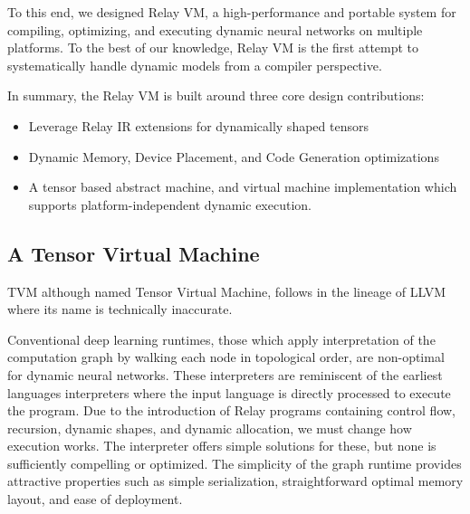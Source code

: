 To this end, we designed Relay VM, a high-performance and portable system for compiling, optimizing,
  and executing dynamic neural networks on multiple platforms.
To the best of our knowledge, Relay VM is the first attempt to
  systematically handle dynamic models from a compiler perspective.

In summary, the Relay VM is built around three core design contributions:
\begin{itemize}
  \item Leverage Relay IR extensions for dynamically shaped tensors
  \item Dynamic Memory, Device Placement, and Code Generation optimizations
  \item A tensor based abstract machine, and virtual machine implementation which
        supports platform-independent dynamic execution.
\end{itemize}

\subsection{A Tensor Virtual Machine}

TVM although named Tensor Virtual Machine, follows in the lineage of LLVM
  where its name is technically inaccurate.

Conventional deep learning runtimes, those which apply interpretation of the
  computation graph by walking each node in topological order, are non-optimal
  for dynamic neural networks.
These interpreters are reminiscent of the earliest
  languages interpreters where the input language is directly
  processed to execute the program.
Due to the introduction of Relay programs containing
  control flow, recursion, dynamic shapes, and dynamic allocation,
  we must change how execution works.
The interpreter offers simple solutions for these,
  but none is sufficiently compelling or optimized.
The simplicity of the graph runtime provides attractive
  properties such as simple serialization, straightforward
  optimal memory layout, and ease of deployment.

